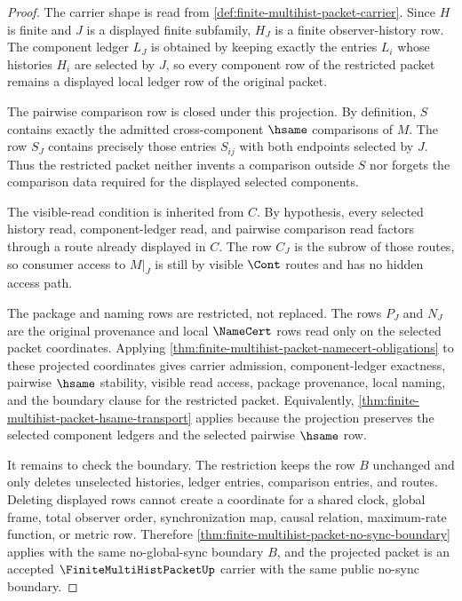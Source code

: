 \begin{proof}
The carrier shape is read from \autoref{def:finite-multihist-packet-carrier}. Since $H$ is finite and $J$ is a displayed finite subfamily, $H_J$ is a finite observer-history row. The component ledger $L_J$ is obtained by keeping exactly the entries $L_i$ whose histories $H_i$ are selected by $J$, so every component row of the restricted packet remains a displayed local ledger row of the original packet.

The pairwise comparison row is closed under this projection. By definition, $S$ contains exactly the admitted cross-component $\hsame$ comparisons of $M$. The row $S_J$ contains precisely those entries $S_{ij}$ with both endpoints selected by $J$. Thus the restricted packet neither invents a comparison outside $S$ nor forgets the comparison data required for the displayed selected components.

The visible-read condition is inherited from $C$. By hypothesis, every selected history read, component-ledger read, and pairwise comparison read factors through a route already displayed in $C$. The row $C_J$ is the subrow of those routes, so consumer access to $M|_J$ is still by visible $\Cont$ routes and has no hidden access path.

The package and naming rows are restricted, not replaced. The rows $P_J$ and $N_J$ are the original provenance and local $\NameCert$ rows read only on the selected packet coordinates. Applying \autoref{thm:finite-multihist-packet-namecert-obligations} to these projected coordinates gives carrier admission, component-ledger exactness, pairwise $\hsame$ stability, visible read access, package provenance, local naming, and the boundary clause for the restricted packet. Equivalently, \autoref{thm:finite-multihist-packet-hsame-transport} applies because the projection preserves the selected component ledgers and the selected pairwise $\hsame$ row.

It remains to check the boundary. The restriction keeps the row $B$ unchanged and only deletes unselected histories, ledger entries, comparison entries, and routes. Deleting displayed rows cannot create a coordinate for a shared clock, global frame, total observer order, synchronization map, causal relation, maximum-rate function, or metric row. Therefore \autoref{thm:finite-multihist-packet-no-sync-boundary} applies with the same no-global-sync boundary $B$, and the projected packet is an accepted $\FiniteMultiHistPacketUp$ carrier with the same public no-sync boundary.
\end{proof}

